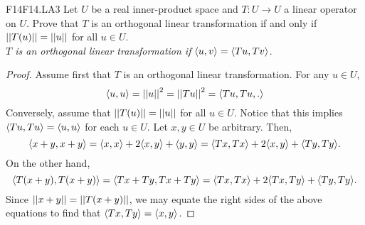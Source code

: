 \documentclass[../AlgebraQualSolutions.tex]{subfiles}
\begin{document}
    \begin{prob}{F14}{F14.LA3}
        Let $U$ be a real inner-product space and $T: U \to U$ a linear operator on $U$. Prove that $T$ is an orthogonal linear transformation if and only if $\norm[T(u)] = \norm[u]$ for all $u \in U$.\\
    
        \emph{$T$ is an orthogonal linear transformation if $\ip{u}{v} = \ip{Tu}{Tv}$}.
    \end{prob}
    
    \begin{proof}
        Assume first that $T$ is an orthogonal linear transformation. For any $u \in U$,
            \[\ip{u}{u} = \norm[u]^2 = \norm[Tu]^2 = \ip{Tu,Tu}.\]
        Conversely, assume that $\norm[T(u)] = \norm[u]$ for all $u \in U$. Notice that this implies $\ip{Tu}{Tu} = \ip{u}{u}$ for each $u \in U$. Let $x, y \in U$ be arbitrary. Then,
            \[\ip{x+y}{x+y} = \ip{x}{x} + 2\ip{x}{y} + \ip{y}{y} = \ip{Tx}{Tx} + 2\ip{x}{y} + \ip{Ty}{Ty}.\]
        On the other hand,
            \[\ip{T(x+y)}{T(x+y)} = \ip{Tx + Ty}{Tx + Ty} = \ip{Tx}{Tx} + 2\ip{Tx}{Ty} + \ip{Ty}{Ty}.\]
        Since $\norm[x + y] = \norm[T(x+y)]$, we may equate the right sides of the above equations to find that $\ip{Tx}{Ty} = \ip{x}{y}$.
    \end{proof}
\end{document}
